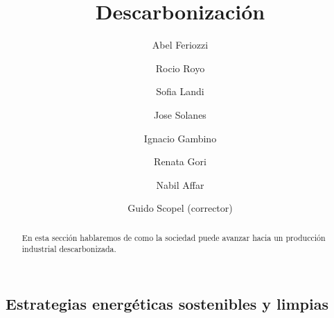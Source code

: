 \documentclass[runningheads]{llncs}
\begin{document}
\title{Descarbonización}
%
\author{Abel Feriozzi \and Rocio Royo \and Sofia Landi \and Jose Solanes \and Ignacio Gambino \and Renata Gori \and Nabil Affar\and Guido Scopel (corrector)}

%
\maketitle 

\begin{abstract}

En esta sección hablaremos de como la sociedad puede avanzar hacia un producción industrial descarbonizada.


\end{abstract}

\begin{flushleft}
\section*{Estrategias energéticas sostenibles y limpias}
\end{flushleft}
\end{document}
